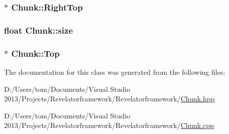 \hypertarget{class_chunk_a8a7593c89d4fe5ed193e68b9ed40016b}{
\subsubsection[{Right\-Top}]{$\ast$ Chunk\-::\-Right\-Top\hspace{0.3cm}{\ttfamily [protected]}}}\label{class_chunk_a8a7593c89d4fe5ed193e68b9ed40016b}
\hypertarget{class_chunk_af46410b580baf2985b01044d5c041b2e}{
\subsubsection[{size}]{\setlength{\rightskip}{0pt plus 5cm}float Chunk\-::size\hspace{0.3cm}{\ttfamily [protected]}}}\label{class_chunk_af46410b580baf2985b01044d5c041b2e}
\hypertarget{class_chunk_ae841d5ab24dfa5ef8865cb4fa05d089d}{
\subsubsection[{Top}]{$\ast$ Chunk\-::\-Top\hspace{0.3cm}{\ttfamily [protected]}}}\label{class_chunk_ae841d5ab24dfa5ef8865cb4fa05d089d}


The documentation for this class was generated from the following files\-:\begin{DoxyCompactItemize}
\item 
D\-:/\-Users/tom/\-Documents/\-Visual Studio 2013/\-Projects/\-Revelatorframework/\-Revelatorframework/\hyperlink{_chunk_8hpp}{Chunk.\-hpp}\item 
D\-:/\-Users/tom/\-Documents/\-Visual Studio 2013/\-Projects/\-Revelatorframework/\-Revelatorframework/\hyperlink{_chunk_8cpp}{Chunk.\-cpp}\end{DoxyCompactItemize}
